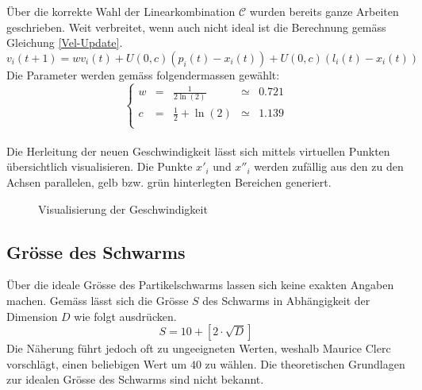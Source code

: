 Über die korrekte Wahl der Linearkombination $\mathcal{C}$ wurden bereits ganze Arbeiten geschrieben. Weit verbreitet, wenn auch nicht ideal ist die Berechnung gemäss Gleichung \ref{Vel-Update}. \\
\begin{equation}
	v_i(t+1) = w v_i(t) + U(0,c) (p_i(t)-x_i(t)) + U(0,c) (l_i(t)-x_i(t))\label{Vel-Update}
\end{equation}
Die Parameter werden gemäss \cite{Clerc-Stagnation} folgendermassen gewählt:
\begin{equation}
	\left\lbrace \begin{array}{lllll}
		w & = & \frac{1}{2 \ln(2)} & \simeq & 0.721 \\
		c & = & \frac{1}{2} + \ln(2) & \simeq & 1.139 \\
	\end{array}	\right. 
\end{equation} \\

Die Herleitung der neuen Geschwindigkeit lässt sich mittels virtuellen Punkten übersichtlich visualisieren. Die Punkte $x'_i$ und $x''_i$ werden zufällig aus den zu den Achsen parallelen, gelb bzw. grün hinterlegten Bereichen generiert.  \\
\begin{figure}[htbp]
	\centering
	
	\caption{Visualisierung der Geschwindigkeit}
	\label{Fig-Visualisierung-Geschwindigkeit}
\end{figure}



\subsection{Grösse des Schwarms}
Über die ideale Grösse des Partikelschwarms lassen sich keine exakten Angaben machen. Gemäss \cite{Clerc-Standards} lässt sich die Grösse $S$ des Schwarms in Abhängigkeit der Dimension $D$ wie folgt ausdrücken.
\begin{equation}
	S = 10 + \left[ 2 \cdot \sqrt{D} \right]
\end{equation}
Die Näherung führt jedoch oft zu ungeeigneten Werten, weshalb Maurice Clerc vorschlägt, einen beliebigen Wert um $40$ zu wählen. Die theoretischen Grundlagen zur idealen Grösse des Schwarms sind nicht bekannt.